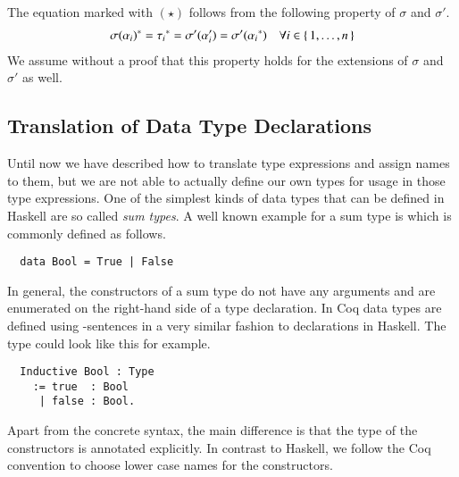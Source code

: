 The equation marked with $(\star)$ follows from the following property of $\sigma$ and $\sigma'$.
\begin{align*}
  {\sigma(\alpha_i)}^{*} = {\tau_i}^{*}
                            = \sigma'(\alpha_i')
                            = \sigma'({\alpha_i}^{*})
  &&\forall i \in \{\, 1, \ldots, n \,\}
\end{align*}
We assume without a proof that this property holds for the extensions of $\sigma$ and $\sigma'$ as well.

\subsection{Translation of Data Type Declarations} \label{sec:translation:type-decl:data}
Until now we have described how to translate type expressions and assign names to them, but we are not able to actually define our own types for usage in those type expressions.
One of the simplest kinds of data types that can be defined in Haskell are so called \textit{sum types}.
A well known example for a sum type is  which is commonly defined as follows.
\begin{verbatim}
  data Bool = True | False
\end{verbatim}
In general, the constructors of a sum type do not have any arguments and are enumerated on the right-hand side of a  type declaration.
In Coq data types are defined using -sentences in a very similar fashion to  declarations in Haskell.
The  type could look like this for example.
\begin{verbatim}
  Inductive Bool : Type
    := true  : Bool
     | false : Bool.
\end{verbatim}
Apart from the concrete syntax, the main difference is that the type of the constructors is annotated explicitly.
In contrast to Haskell, we follow the Coq convention to choose lower case names for the constructors.

